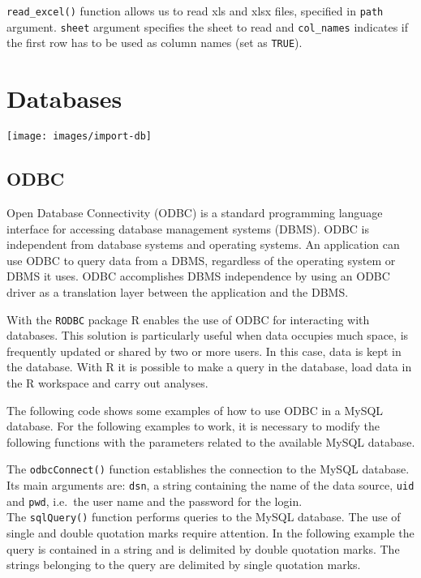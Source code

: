 \documentclass[]{book}
\begin{document}
\texttt{read\_excel()} function allows us to read xls and xlsx files,
specified in \texttt{path} argument. \texttt{sheet} argument specifies
the sheet to read and \texttt{col\_names} indicates if the first row has
to be used as column names (set as \texttt{TRUE}).

\clearpage

\section{Databases}\label{databases}

\texttt{[image: images/import-db]}

\subsection{ODBC}\label{odbc}

Open Database Connectivity (ODBC) is a standard programming language
interface for accessing database management systems (DBMS). ODBC is
independent from database systems and operating systems. An application
can use ODBC to query data from a DBMS, regardless of the operating
system or DBMS it uses. ODBC accomplishes DBMS independence by using an
ODBC driver as a translation layer between the application and the DBMS.

With the \texttt{RODBC} package R enables the use of ODBC for
interacting with databases. This solution is particularly useful when
data occupies much space, is frequently updated or shared by two or more
users. In this case, data is kept in the database. With R it is possible
to make a query in the database, load data in the R workspace and carry
out analyses.

The following code shows some examples of how to use ODBC in a MySQL
database. For the following examples to work, it is necessary to modify
the following functions with the parameters related to the available
MySQL database.

The \texttt{odbcConnect()} function establishes the connection to the
MySQL database. Its main arguments are: \texttt{dsn}, a string
containing the name of the data source, \texttt{uid} and \texttt{pwd},
i.e.~the user name and the password for the login.\\
The \texttt{sqlQuery()} function performs queries to the MySQL database.
The use of single and double quotation marks require attention. In the
following example the query is contained in a string and is delimited by
double quotation marks. The strings belonging to the query are delimited
by single quotation marks.
\end{document}
